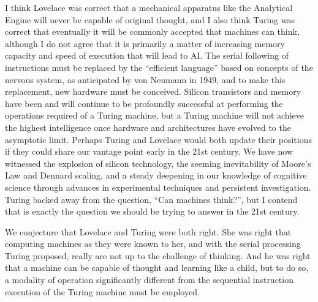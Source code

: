 \documentclass[twocolumn]{article}
\begin{document}
I think Lovelace was correct that a mechanical apparatus like the Analytical Engine will never be capable of original thought, and I also think Turing was correct that eventually it will be commonly accepted that machines can think, although I do not agree that it is primarily a matter of increasing memory capacity and speed of execution that will lead to AI. The serial following of instructions must be replaced by the ``efficient language'' based on concepts of the nervous system, as anticipated by von Neumann in 1949, and to make this replacement, new hardware must be conceived. Silicon transistors and memory have been and will continue to be profoundly successful at performing the operations required of a Turing machine, but a Turing machine will not achieve the highest intelligence once hardware and architectures have evolved to the asymptotic limit. Perhaps Turing and Lovelace would both update their positions if they could share our vantage point early in the 21st century. We have now witnessed the explosion of silicon technology, the seeming inevitability of Moore's Law and Dennard scaling, and a steady deepening in our knowledge of cognitive science through advances in experimental techniques and persistent investigation. Turing backed away from the question, ``Can machines think?'', but I contend that is exactly the question we should be trying to answer in the 21st century. 





We conjecture that Lovelace and Turing were both right. She was right that computing machines as they were known to her, and with the serial processing Turing proposed, really are not up to the challenge of thinking. And he was right that a machine can be capable of thought and learning like a child, but to do so, a modality of operation significantly different from the sequential instruction execution of the Turing machine must be employed.
\end{document}
